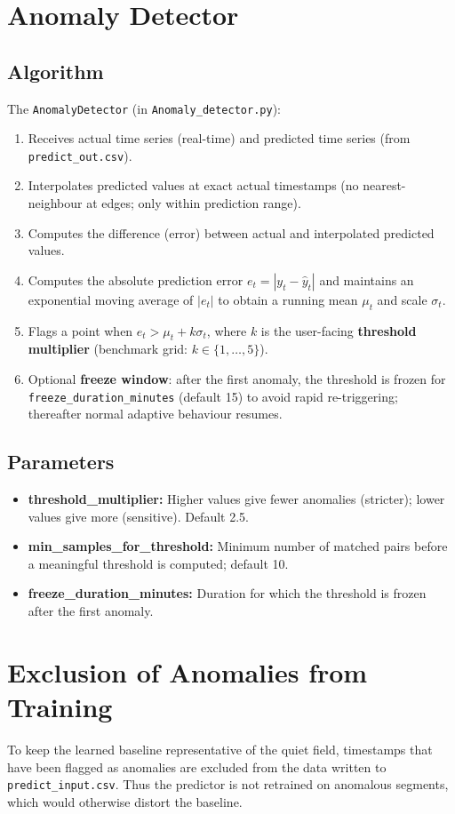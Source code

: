 \section{Anomaly Detector}
\subsection{Algorithm}
The \texttt{AnomalyDetector} (in \texttt{Anomaly\_detector.py}):
\begin{enumerate}[label=(\arabic*)]
    \item Receives actual time series (real-time) and predicted time series (from \texttt{predict\_out.csv}).
    \item Interpolates predicted values at exact actual timestamps (no nearest-neighbour at edges; only within prediction range).
    \item Computes the difference (error) between actual and interpolated predicted values.
    \item Computes the absolute prediction error $e_t = |y_t - \hat y_t|$ and maintains an exponential moving average of $|e_t|$ to obtain a running mean $\mu_t$ and scale $\sigma_t$.
    \item Flags a point when $e_t > \mu_t + k \sigma_t$, where $k$ is the user-facing \textbf{threshold multiplier} (benchmark grid: $k \in \{1,\ldots,5\}$).
    \item Optional \textbf{freeze window}: after the first anomaly, the threshold is frozen for \texttt{freeze\_duration\_minutes} (default 15) to avoid rapid re-triggering; thereafter normal adaptive behaviour resumes.
\end{enumerate}

\subsection{Parameters}
\begin{itemize}
    \item \textbf{threshold\_multiplier:} Higher values give fewer anomalies (stricter); lower values give more (sensitive). Default 2.5.
    \item \textbf{min\_samples\_for\_threshold:} Minimum number of matched pairs before a meaningful threshold is computed; default 10.
    \item \textbf{freeze\_duration\_minutes:} Duration for which the threshold is frozen after the first anomaly.
\end{itemize}

\section{Exclusion of Anomalies from Training}
To keep the learned baseline representative of the quiet field, timestamps that have been flagged as anomalies are excluded from the data written to \texttt{predict\_input.csv}. Thus the predictor is not retrained on anomalous segments, which would otherwise distort the baseline.

